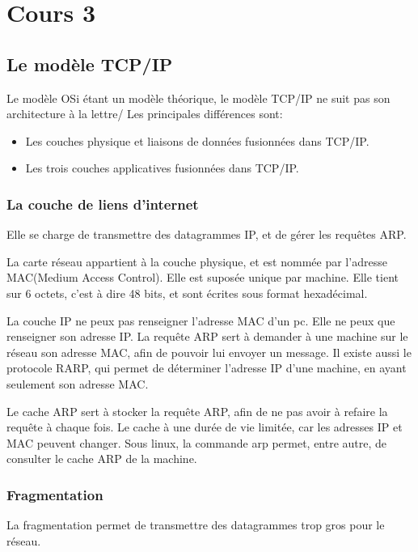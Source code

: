 \section{Cours 3}
\subsection{Le modèle TCP/IP}
Le modèle OSi étant un modèle théorique, le modèle TCP/IP ne suit pas son architecture à la lettre/
Les principales différences sont:
\begin{itemize}
	\item Les couches physique et liaisons de données fusionnées dans TCP/IP.
	\item Les trois couches applicatives fusionnées dans TCP/IP.
\end{itemize}
\subsubsection{La couche de liens d'internet}
Elle se charge de transmettre des datagrammes IP, et de gérer les requêtes ARP.

La carte réseau appartient à la couche physique, et est nommée par l'adresse MAC(Medium Access Control).
Elle est suposée unique par machine. Elle tient sur 6 octets, c'est à dire 48 bits, et sont écrites sous format
hexadécimal.

La couche IP ne peux pas renseigner l'adresse MAC d'un pc. Elle ne peux que renseigner son adresse IP.
La requête ARP sert à demander à une machine sur le réseau son adresse MAC, afin de pouvoir lui envoyer un message.
Il existe aussi le protocole RARP, qui permet de déterminer l'adresse IP d'une machine, en ayant seulement son
adresse MAC.

Le cache ARP sert à stocker la requête ARP, afin de ne pas avoir à refaire la requête à chaque fois.
Le cache à une durée de vie limitée, car les adresses IP et MAC peuvent changer.
Sous linux, la commande arp permet, entre autre, de consulter le cache ARP de la machine.

\subsubsection{Fragmentation}
La fragmentation permet de transmettre des datagrammes trop gros pour le réseau.
